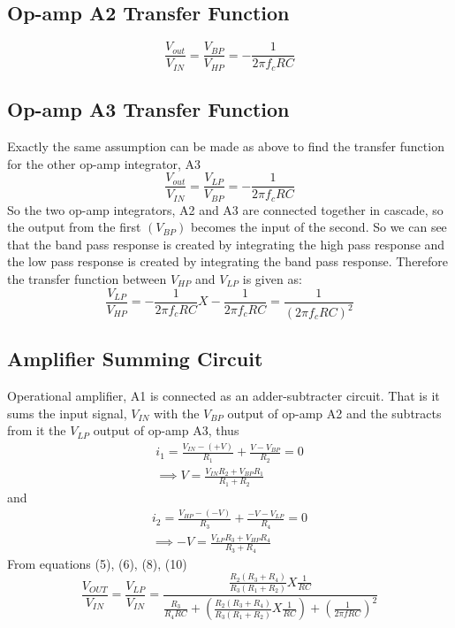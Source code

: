 \documentclass[
	letterpaper, %
	10pt, %
]{CSUniSchoolLabReport}
\begin{document}
\subsection{Op-amp A2 Transfer Function} 
\begin{equation}
	\frac{V_{out} }{V_{IN} } = \frac{V_{BP} }{V_{HP} } = -\frac{1}{2 \pi f_c RC} 
\end{equation}
\subsection{Op-amp A3 Transfer Function} 
Exactly the same assumption can be made as above to find the transfer function for the other op-amp integrator, A3
\begin{equation}
	\frac{V_{out} }{V_{IN} } = \frac{V_{LP} }{V_{BP} } = -\frac{1}{2 \pi f_c RC} 
\end{equation}
So the two op-amp integrators, A2 and A3 are connected together in cascade, so the output from the first $(V_{BP})$ becomes the input of the second. So we can see that the band pass response is created by integrating the high pass response and the low pass response is created by integrating the band pass response. Therefore the transfer function between $V_{HP}$ and $V_{LP}$ is given as:
\begin{equation}
	\frac{V_{LP} }{V_{HP} } = -\frac{1}{2 \pi f_c RC} X -\frac{1}{2 \pi f_c RC} =\frac{1}{(2 \pi f_c RC)^2}   
\end{equation}
\subsection{Amplifier Summing Circuit}
 
Operational amplifier, A1 is connected as an adder-subtracter circuit. That is it sums the input signal, $V_{IN}$ with the $V_{BP}$ output of op-amp A2 and the subtracts from it the $V_{LP}$ output of op-amp A3, thus 
\begin{gather}
	i_1 = \frac{V_{IN}-(+V) }{R_1}+\frac{V-V_{BP} }{R_2} = 0\\
	\implies V = \frac{V_{IN}R_2 + V_{BP}R_1 }{R_1 + R_2}
\end{gather}
and 
\begin{gather}
	i_2 = \frac{V_{HP}-(-V) }{R_3}+\frac{-V-V_{LP} }{R_4} = 0\\
	\implies -V = \frac{V_{LP}R_{3}  + V_{HP}R_4 }{R_3 + R_4}
\end{gather}
From equations (5), (6), (8), (10)
\begin{equation}
	\boxed{\frac{V_{OUT}}{V_{IN}} = \frac{V_{LP} }{V_{IN} } = \frac{\frac{R_2(R_3 + R_4)}{R_3(R_1 + R_2)}X\frac{1}{RC}}{\frac{R_3}{R_4 R C}+\left(\frac{R_2(R_3 + R_4)}{R_3(R_1 + R_2)}X\frac{1}{RC}\right)+\left(\frac{1}{2 \pi f RC}\right)^2}}
\end{equation}
\end{document}
